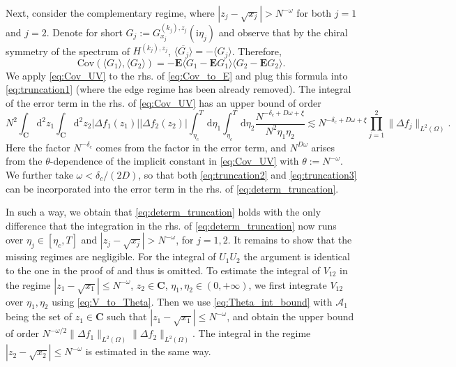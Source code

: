 \documentclass[10pt]{amsart}
\numberwithin{equation}{section}
\newcommand{\dif}{\mathrm{d}}
\newcommand{\E}{\mathbf{E}}
\newcommand{\C}{\mathbf{C}}
\newcommand{\Cov}{\mathrm{Cov}}
\newcommand{\ii}{\mathrm{i}}
\begin{document}
Next, consider the complementary regime, where $|z_j-\sqrt{x_j}|>N^{-\omega}$ for both $j=1$ and $j=2$. Denote for short  $G_j:=G_{x_j}^{(k_j),z_j}(\ii\eta_j)$ and observe that by the chiral symmetry of the spectrum of $H^{(k_j),z_j}$, $\overline{\langle G_j\rangle}=-\langle G_j\rangle$. Therefore,
\begin{equation}
\Cov\left(\langle G_1\rangle, \langle G_2\rangle\right) = -\E\langle G_1-\E G_1\rangle\langle G_2-\E G_2\rangle.
\label{eq:Cov_to_E}
\end{equation}
We apply \eqref{eq:Cov_UV} to the rhs. of \eqref{eq:Cov_to_E} and plug this formula into \eqref{eq:truncation1} (where the edge regime has been already removed). The integral of the error term in the rhs. of \eqref{eq:Cov_UV} has an upper bound of order 
\begin{equation}
N^2\int_\C \dif^2 z_1\int_\C \dif^2 z_2 |\Delta f_1(z_1)||\Delta f_2(z_2)|\int_{\eta_c}^T\dif\eta_1\int_{\eta_c}^T \dif \eta_2 \frac{N^{-\delta_c+D\omega+\xi}}{N^2\eta_1\eta_2}\lesssim N^ {-\delta_c+D\omega+\xi}\prod_{j=1}^2\|\Delta f_j\|_{L^2(\Omega)}.
\label{eq:truncation3}
\end{equation}
Here the factor $N^{-\delta_c}$ comes from the factor in the error term, and $N^{D\omega}$ arises from the $\theta$-dependence of the implicit constant in \eqref{eq:Cov_UV} with $\theta:=N^{-\omega}$. We further take $\omega<\delta_c/(2D)$, so that both \eqref{eq:truncation2} and \eqref{eq:truncation3} can be incorporated into the error term in the rhs. of \eqref{eq:determ_truncation}.

In such a way, we obtain that \eqref{eq:determ_truncation} holds with the only difference that the integration in the rhs. of \eqref{eq:determ_truncation} now runs over $\eta_j\in [\eta_c,T]$ and $|z_j-\sqrt{x_j}|>N^{-\omega}$, for $j=1,2$. It remains to show that the missing regimes are negligible. For the integral of $U_1U_2$ the argument is identical to the one in the proof of \cite[Lemma~4.7]{macroCLT_complex} and thus is omitted. To estimate the integral of $V_{12}$ in the regime $|z_1-\sqrt{x_1}|\le N^{-\omega}$, $z_2\in\C$, $\eta_1,\eta_2\in (0,+\infty)$, we first integrate $V_{12}$ over $\eta_1,\eta_2$ using \eqref{eq:V_to_Theta}. Then we use \eqref{eq:Theta_int_bound} with $\mathcal{A}_1$ being the set of $z_1\in\C$ such that $|z_1-\sqrt{x_1}|\le N^{-\omega}$, and obtain the upper bound of order $N^{-\omega/2}\|\Delta f_1\|_{L^2(\Omega)}\|\Delta f_2\|_{L^2(\Omega)}$. The integral in the regime $|z_2-\sqrt{x_2}|\le N^{-\omega}$ is estimated in the same way.
\end{document}

